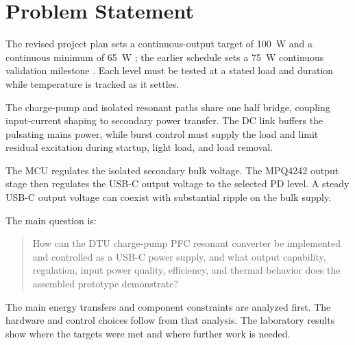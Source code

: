 \section{Problem Statement}
\label{sec:intro-problem}

The revised project plan sets a continuous-output target of \SI{100}{\watt} and a continuous minimum of \SI{65}{\watt} \cite{projectOctoberPlan}; the earlier schedule sets a \SI{75}{\watt} continuous validation milestone \cite{projectEarlierPlan}. Each level must be tested at a stated load and duration while temperature is tracked as it settles.

The charge-pump and isolated resonant paths share one half bridge, coupling input-current shaping to secondary power transfer. The DC link buffers the pulsating mains power, while burst control must supply the load and limit residual excitation during startup, light load, and load removal.

The MCU regulates the isolated secondary bulk voltage. The MPQ4242 output stage then regulates the USB-C output voltage to the selected PD level. A steady USB-C output voltage can coexist with substantial ripple on the bulk supply.

The main question is:
\begin{quote}
How can the DTU charge-pump PFC resonant converter be implemented and controlled as a USB-C power supply, and what output capability, regulation, input power quality, efficiency, and thermal behavior does the assembled prototype demonstrate?
\end{quote}

The main energy transfers and component constraints are analyzed first. The hardware and control choices follow from that analysis. The laboratory results show where the targets were met and where further work is needed.
